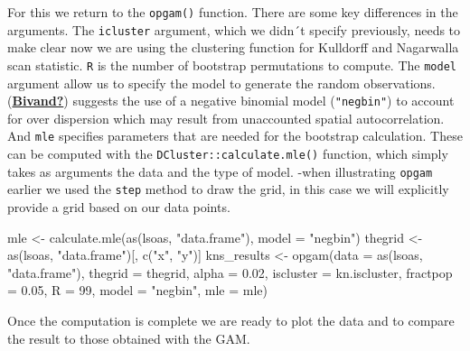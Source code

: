 \documentclass[
  krantz2]{krantz}
\makeatletter
\newenvironment{Shaded}{\begin{snugshade}}{\end{snugshade}}
\newcommand{\AttributeTok}[1]{\textcolor[rgb]{0.61,0.61,0.61}{#1}}
\newcommand{\DecValTok}[1]{\textcolor[rgb]{0.06,0.06,0.06}{#1}}
\newcommand{\FloatTok}[1]{\textcolor[rgb]{0.06,0.06,0.06}{#1}}
\newcommand{\FunctionTok}[1]{\textcolor[rgb]{0,0,0}{#1}}
\newcommand{\NormalTok}[1]{#1}
\newcommand{\OtherTok}[1]{\textcolor[rgb]{0.37,0.37,0.37}{#1}}
\newcommand{\StringTok}[1]{\textcolor[rgb]{0.5,0.5,0.5}{#1}}
\newenvironment{kframe}{%
\medskip{}
\setlength{\fboxsep}{.8em}
 \def\at@end@of@kframe{}%
 \ifinner\ifhmode%
  \def\at@end@of@kframe{\end{minipage}}%
  \begin{minipage}{\columnwidth}%
 \fi\fi%
 \def\FrameCommand##1{\hskip\@totalleftmargin \hskip-\fboxsep
 \colorbox{shadecolor}{##1}\hskip-\fboxsep
     \hskip-\linewidth \hskip-\@totalleftmargin \hskip\columnwidth}%
 \MakeFramed {\advance\hsize-\width
   \@totalleftmargin\z@ \linewidth\hsize
   \@setminipage}}%
 {\par\unskip\endMakeFramed%
 \at@end@of@kframe}
\renewenvironment{Shaded}{\begin{kframe}}{\end{kframe}}
\makeatother
\begin{document}
For this we return to the \texttt{opgam()} function. There are some key differences in the arguments. The \texttt{icluster} argument, which we didn´t specify previously, needs to make clear now we are using the clustering function for Kulldorff and Nagarwalla scan statistic. \texttt{R} is the number of bootstrap permutations to compute. The \texttt{model} argument allow us to specify the model to generate the random observations. (\protect\hyperlink{ref-Bivand}{\textbf{Bivand?}}) suggests the use of a negative binomial model (\texttt{"negbin"}) to account for over dispersion which may result from unaccounted spatial autocorrelation. And \texttt{mle} specifies parameters that are needed for the bootstrap calculation. These can be computed with the \texttt{DCluster::calculate.mle()} function, which simply takes as arguments the data and the type of model. -when illustrating \texttt{opgam} earlier we used the \texttt{step} method to draw the grid, in this case we will explicitly provide a grid based on our data points.

\begin{Shaded}
\begin{Highlighting}[]
\NormalTok{mle }\OtherTok{\textless{}{-}} \FunctionTok{calculate.mle}\NormalTok{(}\FunctionTok{as}\NormalTok{(lsoas, }\StringTok{"data.frame"}\NormalTok{), }\AttributeTok{model =} \StringTok{"negbin"}\NormalTok{)}
\NormalTok{thegrid }\OtherTok{\textless{}{-}} \FunctionTok{as}\NormalTok{(lsoas, }\StringTok{"data.frame"}\NormalTok{)[, }\FunctionTok{c}\NormalTok{(}\StringTok{"x"}\NormalTok{, }\StringTok{"y"}\NormalTok{)]}
\NormalTok{kns\_results }\OtherTok{\textless{}{-}} \FunctionTok{opgam}\NormalTok{(}\AttributeTok{data =} \FunctionTok{as}\NormalTok{(lsoas, }\StringTok{"data.frame"}\NormalTok{),}
                   \AttributeTok{thegrid =}\NormalTok{ thegrid, }\AttributeTok{alpha =} \FloatTok{0.02}\NormalTok{, }\AttributeTok{iscluster =}\NormalTok{ kn.iscluster,}
                   \AttributeTok{fractpop =} \FloatTok{0.05}\NormalTok{, }\AttributeTok{R =} \DecValTok{99}\NormalTok{, }\AttributeTok{model =} \StringTok{"negbin"}\NormalTok{,}
                   \AttributeTok{mle =}\NormalTok{ mle)}
\end{Highlighting}
\end{Shaded}

Once the computation is complete we are ready to plot the data and to compare the result to those obtained with the GAM.
\end{document}
